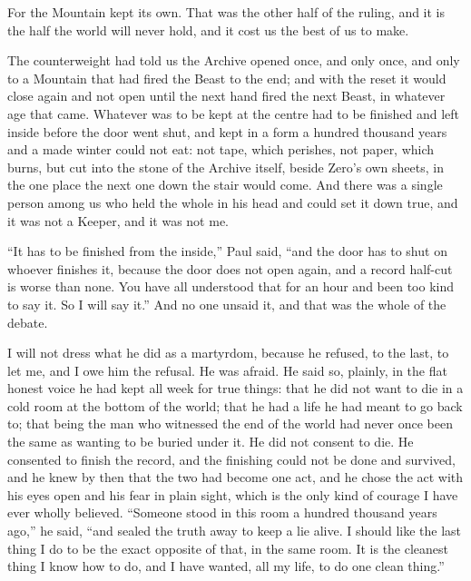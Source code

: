 \ornament

For the Mountain kept its own. That was the other half of the ruling, and it is the half the world will never hold, and it cost us the best of us to make.\par

The counterweight had told us the Archive opened once, and only once, and only to a Mountain that had fired the Beast to the end; and with the reset it would close again and not open until the next hand fired the next Beast, in whatever age that came. Whatever was to be kept at the centre had to be finished and left inside before the door went shut, and kept in a form a hundred thousand years and a made winter could not eat: not tape, which perishes, not paper, which burns, but cut into the stone of the Archive itself, beside Zero's own sheets, in the one place the next one down the stair would come. And there was a single person among us who held the whole in his head and could set it down true, and it was not a Keeper, and it was not me.\par

``It has to be finished from the inside,'' Paul said, ``and the door has to shut on whoever finishes it, because the door does not open again, and a record half-cut is worse than none. You have all understood that for an hour and been too kind to say it. So I will say it.'' And no one unsaid it, and that was the whole of the debate.\par

I will not dress what he did as a martyrdom, because he refused, to the last, to let me, and I owe him the refusal. He was afraid. He said so, plainly, in the flat honest voice he had kept all week for true things: that he did not want to die in a cold room at the bottom of the world; that he had a life he had meant to go back to; that being the man who witnessed the end of the world had never once been the same as wanting to be buried under it. He did not consent to die. He consented to finish the record, and the finishing could not be done and survived, and he knew by then that the two had become one act, and he chose the act with his eyes open and his fear in plain sight, which is the only kind of courage I have ever wholly believed. ``Someone stood in this room a hundred thousand years ago,'' he said, ``and sealed the truth away to keep a lie alive. I should like the last thing I do to be the exact opposite of that, in the same room. It is the cleanest thing I know how to do, and I have wanted, all my life, to do one clean thing.''\par

